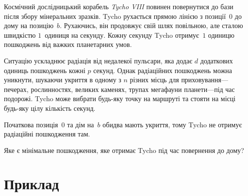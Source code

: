 

\noindent
Космічний дослідницький корабель \emph{Tycho VIII} повинен повернутися до бази після збору мінеральних зразків.
Tycho рухається прямою лінією з позиції~$0$ до дому на позицію~$b$.
Рухаючись, він продовжує свій шлях повільною, але сталою швидкістю $1$~одиниця на секунду.
Кожну секунду Tycho отримує~$1$ одиницю пошкоджень від важких планетарних умов.

Ситуацію ускладнює радіація від недалекої пульсари, яка додає $d$ додаткових одиниць пошкоджень кожні $p$ секунд.
Однак радіаційних пошкоджень можна уникнути, шукаючи укриття в одному з $n$ різних місць для приховування---печерах, рослинностях, великих каменях, трупах мегафауни планети---під час подорожі.
Tycho може вибрати будь-яку точку на маршруті та стояти на місці будь-яку цілу кількість секунд.

Початкова позиція~$0$ та дім на~$b$ обидва мають укриття, тому Tycho не отримує радіаційні пошкодження там.

\medskip
Яке є мінімальне пошкодження, яке отримає Tycho під час повернення до дому?

\section*{Приклад}

